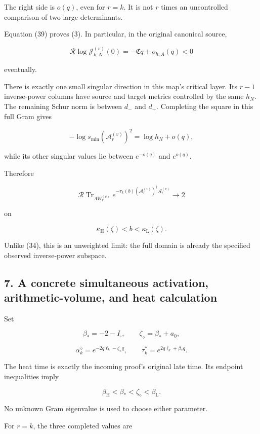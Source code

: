 \documentclass[11pt]{article}
\begin{document}
The right side is \(o(q)\), even for \(r=k\). It is not \(r\) times an uncontrolled comparison of two large determinants.

Equation (39) proves (3). In particular, in the original canonical source,

\[
\boxed{
\mathcal R\log\mathscr J_{k,N}^{(v)}(0)
=
-\mathfrak C q+o_{h,A}(q)<0
}
\tag{40}
\]

eventually.

There is exactly one small singular direction in this map's critical layer. Its \(r-1\) inverse-power columns have source and target metrics controlled by the same \(h_N\). The remaining Schur norm is between \(d_-\) and \(d_+\). Completing the square in this full Gram gives

\[
-\log s_{\min}(\mathscr A_r^{(v)})^2
=\log h_N+o(q),
\]

while its other singular values lie between \(e^{-o(q)}\) and \(e^{o(q)}\).

Therefore

\[
\boxed{
\mathcal R\operatorname{Tr}_{\Lambda W_r^{(v)}}
e^{-\tau_k(b)(\mathscr A_r^{(v)})^\dagger\mathscr A_r^{(v)}}
\longrightarrow2
}
\tag{41}
\]

on

\[
\kappa_{\mathrm H}(\zeta)<b<\kappa_{\mathrm L}(\zeta).
\]

Unlike (34), this is an unweighted limit: the full domain is already the specified observed inverse-power subspace.

\subsection{7. A concrete simultaneous activation, arithmetic-volume, and heat calculation}\label{a-concrete-simultaneous-activation-arithmetic-volume-and-heat-calculation}

Set

\[
\beta_*=-2-I_\square,
\qquad
\zeta_\diamond=\beta_*+a_0,
\]

\[
\boxed{
\alpha_k^\diamond
=e^{-2q\ell_k-\zeta_\diamond q},
\qquad
\tau_k^*
=e^{2q\ell_k+\beta_*q}.
}
\tag{42}
\]

The heat time is exactly the incoming proof's original late time. Its endpoint inequalities imply

\[
\beta_{\mathrm H}<\beta_*<\zeta_\diamond<\beta_{\mathrm L}.
\]

No unknown Gram eigenvalue is used to choose either parameter.

For \(r=k\), the three completed values are
\end{document}
